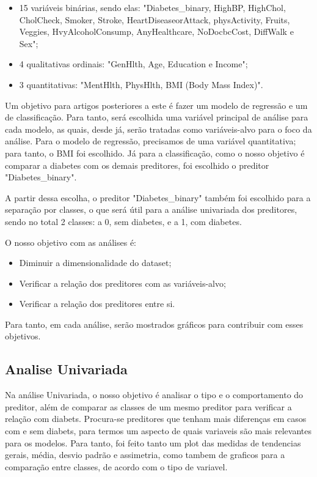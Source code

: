 \documentclass[conference]{IEEEtran}
\begin{document}
\begin{itemize}
    \item 15 variáveis binárias, sendo elas: "Diabetes\_binary, HighBP, HighChol, CholCheck, Smoker, Stroke, HeartDiseaseorAttack, 
physActivity, Fruits, Veggies, HvyAlcoholConsump, AnyHealthcare, NoDocbcCost, DiffWalk e Sex";
    \item 4 qualitativas ordinais: "GenHlth, Age, Education e Income";
    \item 3 quantitativas: "MentHlth, PhysHlth, BMI (Body Mass Index)".
\end{itemize}
 

Um objetivo para artigos posteriores a este é fazer um modelo de regressão e um de classificação. Para tanto, será escolhida uma 
variável principal de análise para cada modelo, as quais, desde já, serão tratadas como variáveis-alvo para o foco da análise.
Para o modelo de regressão, precisamos de uma variável quantitativa; para tanto, o BMI foi escolhido. Já para a classificação, 
como o nosso objetivo é comparar a diabetes com os demais preditores, foi escolhido o preditor "Diabetes\_binary".

A partir dessa escolha, o preditor "Diabetes\_binary" também foi escolhido para a separação por classes, o que será útil para a análise univariada dos preditores, sendo no total 2 classes: a 0, sem diabetes, e a 1, com diabetes. 

O nosso objetivo com as análises é:
\begin{itemize}
    \item Diminuir a dimensionalidade do dataset;
    \item Verificar a relação dos preditores com as variáveis-alvo;
    \item Verificar a relação dos preditores entre si.
\end{itemize}

Para tanto, em cada análise, serão mostrados gráficos para contribuir com esses objetivos.


\subsection{Analise Univariada}

Na análise Univariada, o nosso objetivo é analisar o tipo e o comportamento do preditor, além de comparar as classes de um mesmo preditor 
para verificar a relação com diabets. Procura-se preditores que tenham mais diferenças em casos com e sem diabets, para termos um aspecto de quais 
variaveis são mais relevantes para os modelos. Para tanto, foi feito tanto um plot das medidas de tendencias gerais, média, desvio 
padrão e assimetria, como tambem de graficos para a comparação entre classes, de acordo com o tipo de variavel.
\end{document}
